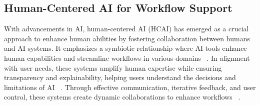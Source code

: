 






\subsection{Human-Centered AI for Workflow Support}%

With advancements in AI, human-centered AI (HCAI) has emerged as a crucial approach to enhance human abilities by fostering collaboration between humans and AI systems. It emphasizes a symbiotic relationship where AI tools enhance human capabilities and streamline workflows in various domains ~\cite{Venigandla2024Hybrid, shneiderman2022human, xu2023transitioning}. 
In alignment with user needs, these systems amplify human expertise while ensuring transparency and explainability, helping users understand the decisions and limitations of AI ~\cite{Ehsan2021Expanding, Kim2024Establishing}. Through effective communication, iterative feedback, and user control, these systems create dynamic collaborations to enhance workflows ~\cite{Hois2019How, Scharowski2023Exploring, Usmani2023Human-Centered}.

%


